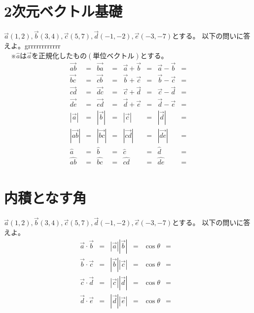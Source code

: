 \documentclass[paper=b4j,landscape,twocolumn,fleqn]{jlreq}
\begin{document}
\section{2次元ベクトル基礎}
$\vec{a}(1,2),　\vec{b}(3,4),　\vec{c}(5,7),　\vec{d}(-1,-2),　\vec{e}(-3,-7)$とする。
以下の問いに答えよ。grrrrrrrrrrrr\\
　※$\hat{a}は\vec{a}を正規化したもの(単位ベクトル)とする。$
\begin{align*}
\vec{ab} &= & \vec{ba} &= & \vec{a}+\vec{b} &= & \vec{a}-\vec{b} &= \\
\vec{bc} &= & \vec{cb} &= & \vec{b}+\vec{c} &= & \vec{b}-\vec{c} &= \\ 
\vec{cd} &= & \vec{dc} &= & \vec{c}+\vec{d} &= & \vec{c}-\vec{d} &= \\ 
\vec{de} &= & \vec{ed} &= & \vec{d}+\vec{e} &= & \vec{d}-\vec{e} &= \\
|\vec{a}| &= & |\vec{b}| &= & |\vec{c}| &= & |\vec{d}| &= \\
|\vec{ab}| &= & |\vec{bc}| &= & |\vec{cd}| &= & |\vec{de}| &= \\
\hat{a} &= & \hat{b} &= & \hat{c} &= & \hat{d} &= \\
\hat{ab} &= & \hat{bc} &= & \hat{cd} &= & \hat{de} &= \\
\end{align*}
\section{内積となす角}  
$\vec{a}(1,2),　\vec{b}(3,4),　\vec{c}(5,7),　\vec{d}(-1,-2),　\vec{e}(-3,-7)$とする。
以下の問いに答えよ。\\
\begin{align*}
\vec{a} \cdot \vec{b} &= & |\vec{a}||\vec{b}| &= & \cos\theta &= &\\
\vec{b} \cdot \vec{c} &= & |\vec{b}||\vec{c}| &= & \cos\theta &= &\\
\vec{c} \cdot \vec{d} &= & |\vec{c}||\vec{d}| &= & \cos\theta &= &\\
\vec{d} \cdot \vec{e} &= & |\vec{d}||\vec{e}| &= & \cos\theta &= &\\
\end{align*}
\end{document}

